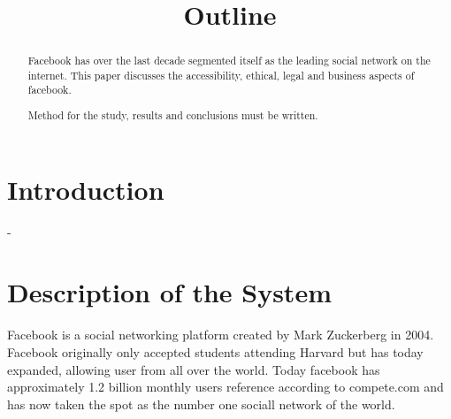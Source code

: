 \documentclass[conference]{IEEEtran}
\begin{document}
\title{Outline}


\author{
\and

\and

\and

}


\maketitle


\begin{abstract}
Facebook has over the last decade segmented itself as the leading social
network on the internet. This paper discusses the accessibility, ethical, legal
and business aspects of facebook. 

Method for the study, results and conclusions must be written. 

\end{abstract}

\section{Introduction}
-
\section{Description of the System}
\label{system}

Facebook is a social networking platform created by Mark Zuckerberg in 2004.
Facebook originally only accepted students attending Harvard but has today
expanded, allowing user from all over the world. Today facebook has
approximately 1.2 billion monthly users reference according to compete.com and
has now taken the spot as the number one sociall network of the world.
\end{document}

